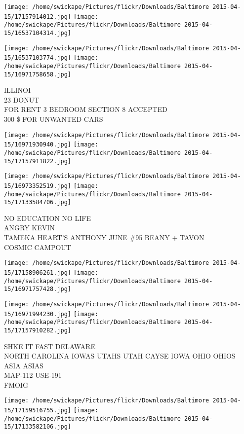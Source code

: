 \documentclass[10pt,letterpaper]{article}
\begin{document}
\texttt{[image: /home/swickape/Pictures/flickr/Downloads/Baltimore 2015-04-15/17157914012.jpg]}
\texttt{[image: /home/swickape/Pictures/flickr/Downloads/Baltimore 2015-04-15/16537104314.jpg]}

\texttt{[image: /home/swickape/Pictures/flickr/Downloads/Baltimore 2015-04-15/16537103774.jpg]}
\texttt{[image: /home/swickape/Pictures/flickr/Downloads/Baltimore 2015-04-15/16971758658.jpg]}

ILLINOI\\
23 DONUT\\
FOR RENT 3 BEDROOM SECTION 8 ACCEPTED\\
300 \$ FOR UNWANTED CARS
\pagebreak

\texttt{[image: /home/swickape/Pictures/flickr/Downloads/Baltimore 2015-04-15/16971930940.jpg]}
\texttt{[image: /home/swickape/Pictures/flickr/Downloads/Baltimore 2015-04-15/17157911822.jpg]}

\texttt{[image: /home/swickape/Pictures/flickr/Downloads/Baltimore 2015-04-15/16973352519.jpg]}
\texttt{[image: /home/swickape/Pictures/flickr/Downloads/Baltimore 2015-04-15/17133584706.jpg]}

NO EDUCATION NO LIFE\\
ANGRY KEVIN\\
TAMEKA HEART'S ANTHONY JUNE \#95 BEANY + TAVON\\
COSMIC CAMPOUT
\pagebreak

\texttt{[image: /home/swickape/Pictures/flickr/Downloads/Baltimore 2015-04-15/17158906261.jpg]}
\texttt{[image: /home/swickape/Pictures/flickr/Downloads/Baltimore 2015-04-15/16971757428.jpg]}

\texttt{[image: /home/swickape/Pictures/flickr/Downloads/Baltimore 2015-04-15/16971994230.jpg]}
\texttt{[image: /home/swickape/Pictures/flickr/Downloads/Baltimore 2015-04-15/17157910282.jpg]}

SHKE IT FAST DELAWARE\\
NORTH CAROLINA IOWAS UTAHS UTAH CAYSE IOWA OHIO OHIOS ASIA ASIAS\\
MAP{-}112 USE{-}191\\
FMOIG
\pagebreak

\texttt{[image: /home/swickape/Pictures/flickr/Downloads/Baltimore 2015-04-15/17159516755.jpg]}
\texttt{[image: /home/swickape/Pictures/flickr/Downloads/Baltimore 2015-04-15/17133582106.jpg]}
\end{document}
